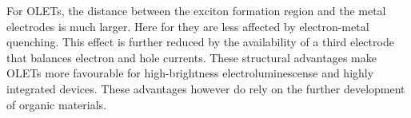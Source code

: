 For OLETs, the distance between the exciton formation region and the metal electrodes is much larger. Here for they are less affected by electron-metal quenching. This effect is further reduced by the availability of a third electrode that balances electron and hole currents. These structural advantages make OLETs more favourable for high-brightness electroluminescense and highly integrated devices. These advantages however do rely on the further development of organic materials.
